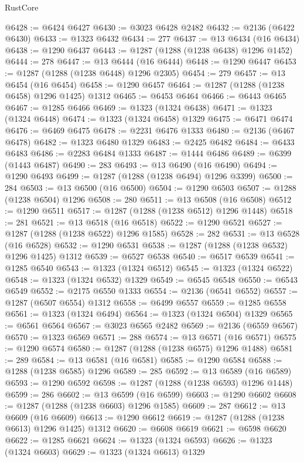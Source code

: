 \begin{lexlean}{RustCore}
\begin{coremodule}
@6428 := @6424 @6427
@6430 := @3023 @6428 @2482
@6432 := @2136 (@6422 @6430)
@6433 := @1323 @6432
@6434 := 277
@6437 := @13 @6434 (@16 @6434)
@6438 := @1290 @6437
@6443 := @1287 (@1288 (@1238 @6438) @1296 @1452)
@6444 := 278
@6447 := @13 @6444 (@16 @6444)
@6448 := @1290 @6447
@6453 := @1287 (@1288 (@1238 @6448) @1296 @2305)
@6454 := 279
@6457 := @13 @6454 (@16 @6454)
@6458 := @1290 @6457
@6464 := @1287 (@1288 (@1238 @6458) @1296 @1425) @1312
@6465 := @6453 @6464
@6466 := @6443 @6465
@6467 := @1285 @6466
@6469 := @1323 (@1324 @6438)
@6471 := @1323 (@1324 @6448)
@6474 := @1323 (@1324 @6458) @1329
@6475 := @6471 @6474
@6476 := @6469 @6475
@6478 := @2231 @6476 @1333
@6480 := @2136 (@6467 @6478)
@6482 := @1323 @6480 @1329
@6483 := @2425 @6482
@6484 := @6433 @6483
@6486 := @2283 @6484 @1333
@6487 := @1444 @6486
@6489 := @6399 (@1443 @6487)
@6490 := 283
@6493 := @13 @6490 (@16 @6490)
@6494 := @1290 @6493
@6499 := @1287 (@1288 (@1238 @6494) @1296 @3399)
@6500 := 284
@6503 := @13 @6500 (@16 @6500)
@6504 := @1290 @6503
@6507 := @1288 (@1238 @6504) @1296
@6508 := 280
@6511 := @13 @6508 (@16 @6508)
@6512 := @1290 @6511
@6517 := @1287 (@1288 (@1238 @6512) @1296 @1448)
@6518 := 281
@6521 := @13 @6518 (@16 @6518)
@6522 := @1290 @6521
@6527 := @1287 (@1288 (@1238 @6522) @1296 @1585)
@6528 := 282
@6531 := @13 @6528 (@16 @6528)
@6532 := @1290 @6531
@6538 := @1287 (@1288 (@1238 @6532) @1296 @1425) @1312
@6539 := @6527 @6538
@6540 := @6517 @6539
@6541 := @1285 @6540
@6543 := @1323 (@1324 @6512)
@6545 := @1323 (@1324 @6522)
@6548 := @1323 (@1324 @6532) @1329
@6549 := @6545 @6548
@6550 := @6543 @6549
@6552 := @2175 @6550 @1333
@6554 := @2136 (@6541 @6552)
@6557 := @1287 (@6507 @6554) @1312
@6558 := @6499 @6557
@6559 := @1285 @6558
@6561 := @1323 (@1324 @6494)
@6564 := @1323 (@1324 @6504) @1329
@6565 := @6561 @6564
@6567 := @3023 @6565 @2482
@6569 := @2136 (@6559 @6567)
@6570 := @1323 @6569
@6571 := 288
@6574 := @13 @6571 (@16 @6571)
@6575 := @1290 @6574
@6580 := @1287 (@1288 (@1238 @6575) @1296 @1488)
@6581 := 289
@6584 := @13 @6581 (@16 @6581)
@6585 := @1290 @6584
@6588 := @1288 (@1238 @6585) @1296
@6589 := 285
@6592 := @13 @6589 (@16 @6589)
@6593 := @1290 @6592
@6598 := @1287 (@1288 (@1238 @6593) @1296 @1448)
@6599 := 286
@6602 := @13 @6599 (@16 @6599)
@6603 := @1290 @6602
@6608 := @1287 (@1288 (@1238 @6603) @1296 @1585)
@6609 := 287
@6612 := @13 @6609 (@16 @6609)
@6613 := @1290 @6612
@6619 := @1287 (@1288 (@1238 @6613) @1296 @1425) @1312
@6620 := @6608 @6619
@6621 := @6598 @6620
@6622 := @1285 @6621
@6624 := @1323 (@1324 @6593)
@6626 := @1323 (@1324 @6603)
@6629 := @1323 (@1324 @6613) @1329

\end{coremodule}
\end{lexlean}
